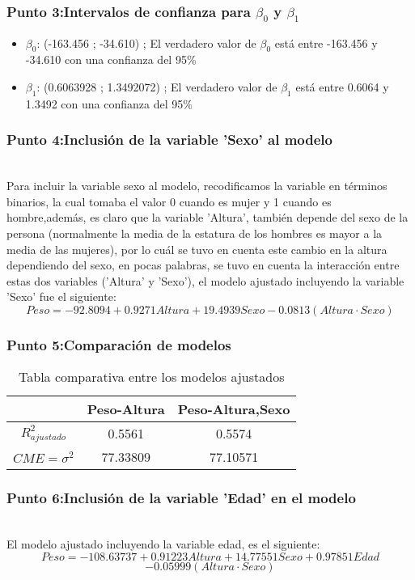 \documentclass[12pt]{beamer}
\begin{document}
\begin{frame}
\frametitle{Punto 3:Intervalos de confianza para $\beta_{0}$ y $\beta_{1}$}
\begin{itemize}
\item $\beta_{0}$: (-163.456 ; -34.610)  ; El verdadero valor de $\beta_{0}$ está entre -163.456 y -34.610 con una confianza del 95\%
\item $\beta_{1}$: (0.6063928 ; 1.3492072) ; El verdadero valor de $\beta_{1}$ está entre 0.6064 y 1.3492 con una confianza del 95\%
\end{itemize}

\end{frame}
\begin{frame}
\frametitle{Punto 4:Inclusión de la variable 'Sexo' al modelo}
~\\ Para incluir la variable sexo al modelo, recodificamos la variable en términos binarios, la cual tomaba el valor 0 cuando es mujer y 1 cuando es hombre,además, es claro que la variable 'Altura', también depende del sexo de la persona (normalmente la media de la estatura de los hombres es mayor a la media de las mujeres), por lo cuál se tuvo en cuenta este cambio en la altura dependiendo del sexo, en pocas palabras, se tuvo en cuenta la interacción entre estas dos variables ('Altura' y 'Sexo'), el modelo ajustado incluyendo la variable 'Sexo' fue el siguiente:
~\\ $$Peso=-92.8094+0.9271 Altura+ 19.4939 Sexo -0.0813(Altura\cdot Sexo)$$
\end{frame}
\begin{frame}
\frametitle{Punto 5:Comparación de modelos}
\begin{table}[!htb]
\caption{Tabla comparativa entre los modelos ajustados}\label{Tabla1}
\begin{center}
\begin{tabular}{ccc}
\hline
 & Peso-Altura & Peso-Altura,Sexo \\ 
\hline
$R^2_{ajustado}$ & 0.5561 & 0.5574 \\ 
 
$CME=\sigma^2$ & 77.33809 & 77.10571 \\ 
\hline 
\end{tabular}
\end{center}
\end{table}
\end{frame}

\begin{frame}
\frametitle{Punto 6:Inclusión de la variable 'Edad' en el modelo}
~\\ El modelo ajustado incluyendo la variable edad, es el siguiente:
~\\ $$Peso=-108.63737+0.91223 Altura+14.77551 Sexo+0.97851 Edad$$
$$-0.05999(Altura\cdot Sexo)$$
\end{frame}
\end{document}
